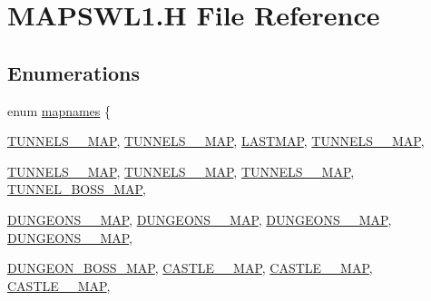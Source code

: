 \hypertarget{MAPSWL1_8H}{
\section{MAPSWL1.H File Reference}
\label{MAPSWL1_8H}
}
\subsection*{Enumerations}
\begin{DoxyCompactItemize}
\item 
enum \hyperlink{MAPSWL1_8H_a1949852ef0462081a2b248dd4918bb86}{mapnames} \{ \par
\hyperlink{MAPSSDM_8H_a1949852ef0462081a2b248dd4918bb86acbdf704da923641aa047528fadd773fa}{TUNNELS\_\_\-MAP}, 
\hyperlink{MAPSSDM_8H_a1949852ef0462081a2b248dd4918bb86a0714d98acd387ceab72b37c2ce15337b}{TUNNELS\_\_\-MAP}, 
\hyperlink{MAPSSDM_8H_a1949852ef0462081a2b248dd4918bb86ad3af5aeeef56724be68af11d0a6680b3}{LASTMAP}, 
\hyperlink{MAPSSOD_8H_a1949852ef0462081a2b248dd4918bb86acbdf704da923641aa047528fadd773fa}{TUNNELS\_\_\-MAP}, 
\par
\hyperlink{MAPSSOD_8H_a1949852ef0462081a2b248dd4918bb86a0714d98acd387ceab72b37c2ce15337b}{TUNNELS\_\_\-MAP}, 
\hyperlink{MAPSSOD_8H_a1949852ef0462081a2b248dd4918bb86a0d874dc7ecc82a838419319fdf1e8981}{TUNNELS\_\_\-MAP}, 
\hyperlink{MAPSSOD_8H_a1949852ef0462081a2b248dd4918bb86acaaf614245869150fddf14e70c58e814}{TUNNELS\_\_\-MAP}, 
\hyperlink{MAPSSOD_8H_a1949852ef0462081a2b248dd4918bb86a00ffe67ecf2d79d6e249734e3c10f835}{TUNNEL\_\-BOSS\_\-MAP}, 
\par
\hyperlink{MAPSSOD_8H_a1949852ef0462081a2b248dd4918bb86a2a41440fb231f456ba48a61b3750a433}{DUNGEONS\_\_\-MAP}, 
\hyperlink{MAPSSOD_8H_a1949852ef0462081a2b248dd4918bb86a71604e9c0be7e84b7a077e1014d16551}{DUNGEONS\_\_\-MAP}, 
\hyperlink{MAPSSOD_8H_a1949852ef0462081a2b248dd4918bb86ac36508495618f8433a43efca3cb5db5d}{DUNGEONS\_\_\-MAP}, 
\hyperlink{MAPSSOD_8H_a1949852ef0462081a2b248dd4918bb86a708337f0295e8e4da5d955451956a603}{DUNGEONS\_\_\-MAP}, 
\par
\hyperlink{MAPSSOD_8H_a1949852ef0462081a2b248dd4918bb86a1b3c9e6cc77c7f84b6ae038051781e3d}{DUNGEON\_\-BOSS\_\-MAP}, 
\hyperlink{MAPSSOD_8H_a1949852ef0462081a2b248dd4918bb86a4c9c00b088ae5f84423f30ea9fa44f33}{CASTLE\_\_\-MAP}, 
\hyperlink{MAPSSOD_8H_a1949852ef0462081a2b248dd4918bb86acb20a9eff2b66ec774cd4516ad2c6d13}{CASTLE\_\_\-MAP}, 
\hyperlink{MAPSSOD_8H_a1949852ef0462081a2b248dd4918bb86a06b22b4044c73d114ec301f7e57fb22c}{CASTLE\_\_\-MAP}, 

\end{DoxyCompactItemize}
